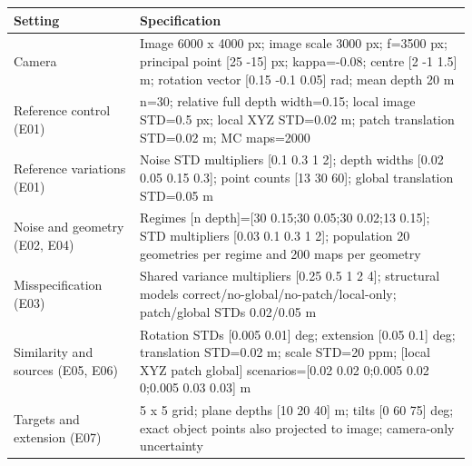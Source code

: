 \begin{tabular}{ll}
\hline
Setting & Specification \\
\hline
Camera & Image 6000 x 4000 px; image scale 3000 px; f=3500 px; principal point [25 -15] px; kappa=-0.08; centre [2 -1 1.5] m; rotation vector [0.15 -0.1 0.05] rad; mean depth 20 m \\
Reference control (E01) & n=30; relative full depth width=0.15; local image STD=0.5 px; local XYZ STD=0.02 m; patch translation STD=0.02 m; MC maps=2000 \\
Reference variations (E01) & Noise STD multipliers [0.1 0.3 1 2]; depth widths [0.02 0.05 0.15 0.3]; point counts [13 30 60]; global translation STD=0.05 m \\
Noise and geometry (E02, E04) & Regimes [n depth]=[30 0.15;30 0.05;30 0.02;13 0.15]; STD multipliers [0.03 0.1 0.3 1 2]; population 20 geometries per regime and 200 maps per geometry \\
Misspecification (E03) & Shared variance multipliers [0.25 0.5 1 2 4]; structural models correct/no-global/no-patch/local-only; patch/global STDs 0.02/0.05 m \\
Similarity and sources (E05, E06) & Rotation STDs [0.005 0.01] deg; extension [0.05 0.1] deg; translation STD=0.02 m; scale STD=20 ppm; [local XYZ patch global] scenarios=[0.02 0.02 0;0.005 0.02 0;0.005 0.03 0.03] m \\
Targets and extension (E07) & 5 x 5 grid; plane depths [10 20 40] m; tilts [0 60 75] deg; exact object points also projected to image; camera-only uncertainty \\
\hline
\end{tabular}
